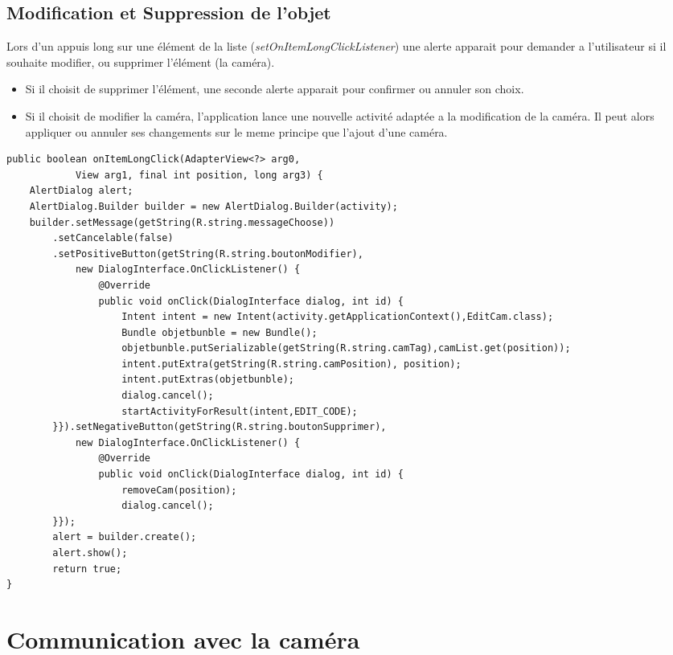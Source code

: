 \subsection{Modification et Suppression de l'objet}
Lors d'un appuis long sur une élément de la liste
(\textit{setOnItemLongClickListener}) une alerte apparait pour demander a
l'utilisateur si il souhaite modifier, ou supprimer l'élément (la caméra).
\begin{itemize}
  \item Si il choisit de supprimer l'élément, une seconde alerte apparait pour confirmer
ou annuler son choix. 
\item Si il choisit de modifier la caméra, l'application lance une nouvelle
activité adaptée a la modification de la caméra. Il peut alors appliquer ou
annuler ses changements sur le meme principe que l'ajout d'une caméra.
\end{itemize}
\newpage
\begin{changemargin}{0cm}{0cm}
\begin{lstlisting}[caption={Gestion d'un appui long sur un élément de la
liste.}]
public boolean onItemLongClick(AdapterView<?> arg0, 
			View arg1, final int position, long arg3) { 
	AlertDialog alert; 
	AlertDialog.Builder builder = new AlertDialog.Builder(activity);
	builder.setMessage(getString(R.string.messageChoose))
		.setCancelable(false)
		.setPositiveButton(getString(R.string.boutonModifier),
			new DialogInterface.OnClickListener() {
				@Override
				public void onClick(DialogInterface dialog, int id) {
					Intent intent = new Intent(activity.getApplicationContext(),EditCam.class); 
					Bundle objetbunble = new Bundle();
					objetbunble.putSerializable(getString(R.string.camTag),camList.get(position));
					intent.putExtra(getString(R.string.camPosition), position);
					intent.putExtras(objetbunble);
					dialog.cancel();
					startActivityForResult(intent,EDIT_CODE);
		}}).setNegativeButton(getString(R.string.boutonSupprimer),
			new DialogInterface.OnClickListener() {
				@Override
				public void onClick(DialogInterface dialog, int id) {
					removeCam(position);
					dialog.cancel();
		}});
		alert = builder.create();
		alert.show();
		return true;
}
\end{lstlisting}
\end{changemargin}


\section{Communication avec la caméra}


